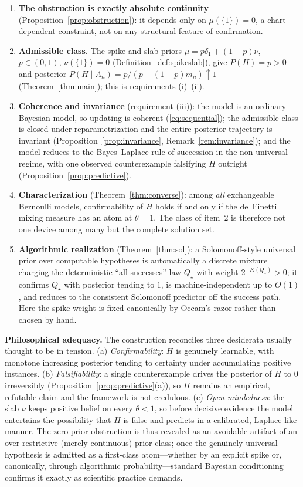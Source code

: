 \documentclass{amsart}
\theoremstyle{definition}
\begin{document}
\begin{enumerate}
\item \textbf{The obstruction is exactly absolute continuity}
(Proposition~\ref{prop:obstruction}): it depends only on $\mu(\{1\})=0$, a
chart-dependent constraint, not on any structural feature of confirmation.

\item \textbf{Admissible class.} The spike-and-slab priors
$\mu=p\delta_1+(1-p)\nu$, $p\in(0,1)$, $\nu(\{1\})=0$
(Definition~\ref{def:spikeslab}), give $P(H)=p>0$ and posterior
$P(H\mid A_n)=p/(p+(1-p)m_n)\uparrow1$
(Theorem~\ref{thm:main}); this is requirements (i)--(ii).

\item \textbf{Coherence and invariance} (requirement (iii)):
the model is an ordinary Bayesian model, so updating is coherent
(\eqref{eq:sequential}); the admissible class is closed under reparametrization
and the entire posterior trajectory is invariant
(Proposition~\ref{prop:invariance}, Remark~\ref{rem:invariance}); and the model
reduces to the Bayes--Laplace rule of succession in the non-universal regime,
with one observed counterexample falsifying $H$ outright
(Proposition~\ref{prop:predictive}).

\item \textbf{Characterization} (Theorem~\ref{thm:converse}): among
\emph{all} exchangeable Bernoulli models, confirmability of $H$ holds if and only
if the de~Finetti mixing measure has an atom at $\theta=1$. The class of item~2
is therefore not one device among many but the complete solution set.

\item \textbf{Algorithmic realization} (Theorem~\ref{thm:sol}): a
Solomonoff-style universal prior over computable hypotheses is automatically a
discrete mixture charging the deterministic ``all successes'' law $Q_\star$ with
weight $2^{-K(Q_\star)}>0$; it confirms $Q_\star$ with posterior tending to $1$,
is machine-independent up to $O(1)$, and reduces to the consistent Solomonoff
predictor off the success path. Here the spike weight is fixed canonically by
Occam's razor rather than chosen by hand.
\end{enumerate}

\noindent\textbf{Philosophical adequacy.} The construction reconciles three
desiderata usually thought to be in tension. (a) \emph{Confirmability}: $H$ is
genuinely learnable, with monotone increasing posterior tending to certainty
under accumulating positive instances. (b) \emph{Falsifiability}: a single
counterexample drives the posterior of $H$ to $0$ irreversibly
(Proposition~\ref{prop:predictive}(a)), so $H$ remains an empirical, refutable
claim and the framework is not credulous. (c) \emph{Open-mindedness}: the slab
$\nu$ keeps positive belief on every $\theta<1$, so before decisive evidence the
model entertains the possibility that $H$ is false and predicts in a calibrated,
Laplace-like manner. The zero-prior obstruction is thus revealed as an avoidable
artifact of an over-restrictive (merely-continuous) prior class; once the
genuinely universal hypothesis is admitted as a first-class atom---whether by an
explicit spike or, canonically, through algorithmic probability---standard
Bayesian conditioning confirms it exactly as scientific practice demands.
\end{document}
